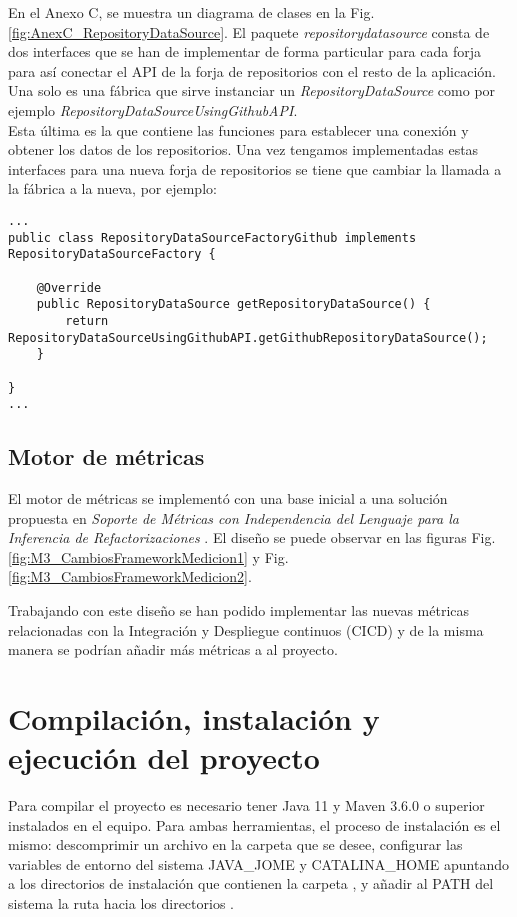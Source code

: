 En el Anexo C, se muestra un diagrama de clases en la Fig. \ref{fig:AnexC_RepositoryDataSource}. El paquete \textit{repositorydatasource} consta de dos interfaces que se han de implementar de forma particular para cada forja para así conectar el API de la forja de repositorios con el resto de la aplicación. \\
Una solo es una fábrica que sirve instanciar un \textit{RepositoryDataSource} como por ejemplo \textit{RepositoryDataSourceUsingGithubAPI}.\\ Esta última es la que contiene las funciones para establecer una conexión y obtener los datos de los repositorios. Una vez tengamos implementadas estas interfaces para una nueva forja de repositorios se tiene que cambiar la llamada a la fábrica a la nueva, por ejemplo:

\begin{minipage}{\linewidth}
\tiny \begin{verbatim}
...
public class RepositoryDataSourceFactoryGithub implements RepositoryDataSourceFactory {

	@Override
	public RepositoryDataSource getRepositoryDataSource() {
		return RepositoryDataSourceUsingGithubAPI.getGithubRepositoryDataSource();
	}

}
...
\end{verbatim}
\end{minipage}	

\subsection{Motor de métricas}
El motor de métricas se implementó con una base inicial a una solución propuesta en \textit{Soporte de Métricas con Independencia del Lenguaje para la Inferencia de Refactorizaciones} \cite{marticorena_sanchez_soporte_2005}. El diseño se puede observar en las figuras Fig. \ref{fig:M3_CambiosFrameworkMedicion1} y Fig. \ref{fig:M3_CambiosFrameworkMedicion2}.

Trabajando con este diseño se han podido implementar las nuevas métricas relacionadas con la Integración y Despliegue continuos (CICD) y de la misma manera se podrían añadir más métricas a al proyecto.

\section{Compilación, instalación y ejecución del proyecto}
Para compilar el proyecto es necesario tener Java 11 y Maven 3.6.0 o superior instalados en el equipo. Para ambas herramientas, el proceso de instalación es el mismo: descomprimir un archivo en la carpeta que se desee, configurar las variables de entorno del sistema JAVA\_JOME y CATALINA\_HOME apuntando a los directorios de instalación que contienen la carpeta , y añadir al PATH del sistema la ruta hacia los directorios .\\

